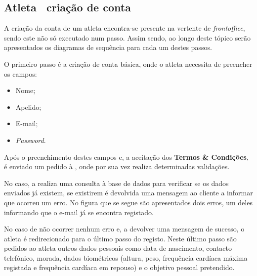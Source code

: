 \subsection{Atleta \textemdash~criação de conta}
\label{registerSequenceDiagram}

A criação da conta de um atleta encontra-se presente na vertente de \textit{frontoffice}, sendo este não só executado num passo. Assim sendo, ao longo deste tópico serão apresentados os diagramas de sequência para cada um destes passos.


O primeiro passo é a criação de conta básica, onde o atleta necessita de preencher os campos:

\begin{itemize}
	\item Nome;
	\item Apelido;
	\item E-mail;
	\item \textit{Password}.
\end{itemize}

Após o preenchimento destes campos e, a aceitação dos \textbf{Termos \& Condições}, é enviado um pedido à \textbf{}, onde por sua vez realiza determinadas validações.


No caso, a \textbf{} realiza uma consulta à base de dados para verificar se os dados enviados já existem, se existirem é devolvida uma mensagem ao cliente a informar que ocorreu um erro. No figura que se segue são apresentados dois erros, um deles informando que o e-mail já se encontra registado.


No caso de não ocorrer nenhum erro e, a \textbf{} devolver uma mensagem de sucesso, o atleta é redirecionado para o último passo do registo. Neste último passo são pedidos ao atleta outros dados pessoais como data de nascimento, contacto telefónico, morada, dados biométricos (altura, peso, frequência cardíaca máxima registada e frequência cardíaca em repouso) e o objetivo pessoal pretendido.


